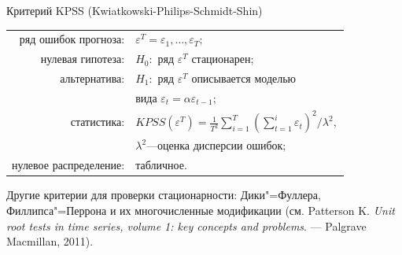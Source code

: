 \documentclass[9pt,pdf,utf8,hyperref={unicode},aspectratio=169]{beamer}
\begin{document}
\begin{frame}{Критерий KPSS (Kwiatkowski-Philips-Schmidt-Shin)}
	\begin{center}
		\begin{tabular}{rl}
			ряд ошибок прогноза:            & $\varepsilon^T = \varepsilon_1,\dots,\varepsilon_T;$ \\
			нулевая гипотеза:               & $H_0\colon$ ряд $\varepsilon^T$ стационарен;\\
			альтернатива:                   & $H_1\colon$ ряд $\varepsilon^T$ описывается моделью \\
			& вида $\varepsilon_t = \alpha\varepsilon_{t-1};$ \\
			статистика:                     & $KPSS\left(\varepsilon^T\right) = \frac1{T^2} \sum\limits_{i=1}^T \left(\sum\limits_{t=1}^i \varepsilon_t\right)^2 \Big/ \lambda^2,$ \\
            &$\lambda^2$---оценка дисперсии ошибок;\\
			нулевое распределение:          & табличное.\\
		\end{tabular}
	\end{center}
	
	\bigskip
	
	Другие критерии для проверки стационарности: Дики"=Фуллера, Филлипса"=Перрона и их многочисленные модификации (см. Patterson K.  \textit{Unit root tests in time series, volume 1: key concepts and problems}. --- Palgrave Macmillan, 2011).	
\end{frame}
\end{document}
